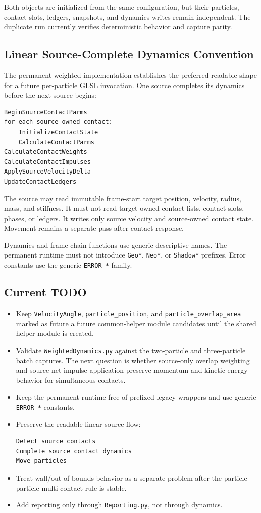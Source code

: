 Both objects are initialized from the same configuration, but their particles,
contact slots, ledgers, snapshots, and dynamics writes remain independent.  The
duplicate run currently verifies deterministic behavior and capture parity.

\subsection{Linear Source-Complete Dynamics Convention}

The permanent weighted implementation establishes the preferred readable shape
for a future per-particle GLSL invocation.  One source completes its dynamics before
the next source begins:

\begin{verbatim}
BeginSourceContactParms
for each source-owned contact:
    InitializeContactState
    CalculateContactParms
CalculateContactWeights
CalculateContactImpulses
ApplySourceVelocityDelta
UpdateContactLedgers
\end{verbatim}

The source may read immutable frame-start target position, velocity, radius,
mass, and stiffness.  It must not read target-owned contact lists, contact
slots, phases, or ledgers.  It writes only source velocity and source-owned
contact state.  Movement remains a separate pass after contact response.

Dynamics and frame-chain functions use generic descriptive names.  The
permanent runtime must not introduce \texttt{Geo*}, \texttt{Neo*}, or
\texttt{Shadow*} prefixes.  Error constants use the generic
\texttt{ERROR\_*} family.

\subsection{Current TODO}

\begin{itemize}
    \item Keep \texttt{VelocityAngle}, \texttt{particle\_position}, and
    \texttt{particle\_overlap\_area} marked as future
    a future common-helper module candidates until the shared helper module is
    created.
    \item Validate \texttt{WeightedDynamics.py} against the two-particle and
    three-particle batch captures.  The next question is whether source-only
    overlap weighting and source-net impulse application preserve momentum and
    kinetic-energy behavior for simultaneous contacts.
    \item Keep the permanent runtime free of prefixed legacy wrappers and use
    generic \texttt{ERROR\_*} constants.
    \item Preserve the readable linear source flow:
    \begin{verbatim}
Detect source contacts
Complete source contact dynamics
Move particles
    \end{verbatim}
    \item Treat wall/out-of-bounds behavior as a separate problem after the
    particle-particle multi-contact rule is stable.
    \item Add reporting only through \texttt{Reporting.py}, not through dynamics.
\end{itemize}
